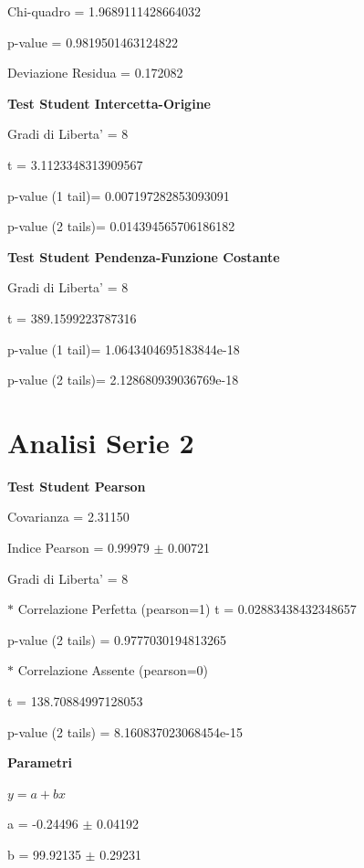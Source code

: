 \documentclass{article}
\begin{document}
Chi-quadro = 1.9689111428664032

p-value = 0.9819501463124822

Deviazione Residua = 0.172082

\textbf{Test Student Intercetta-Origine}

Gradi di Liberta' = 8

t = 3.1123348313909567

p-value (1 tail)= 0.007197282853093091

p-value (2 tails)= 0.014394565706186182

\textbf{Test Student Pendenza-Funzione Costante}

Gradi di Liberta' = 8

t = 389.1599223787316

p-value (1 tail)= 1.0643404695183844e-18

p-value (2 tails)= 2.128680939036769e-18

\section*{Analisi Serie 2}

\textbf{Test Student Pearson}

Covarianza = 2.31150

Indice Pearson = 0.99979 $\pm$ 0.00721

Gradi di Liberta' = 8

$\ast$ Correlazione Perfetta (pearson=1)
t = 0.02883438432348657

p-value (2 tails) = 0.9777030194813265

$\ast$ Correlazione Assente (pearson=0)

t = 138.70884997128053

p-value (2 tails) = 8.160837023068454e-15

\textbf{Parametri}

$y = a + bx$

a = -0.24496 $\pm$ 0.04192

b = 99.92135 $\pm$ 0.29231
\end{document}

